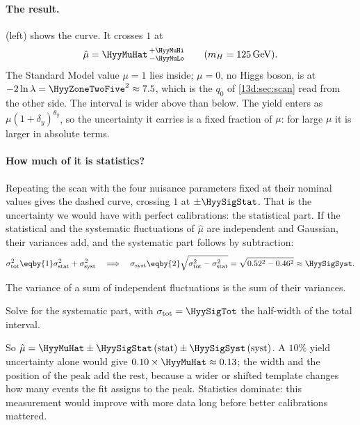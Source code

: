 \paragraph{The result.}
 (left) shows the curve. It crosses $1$ at
\[
  \hat\mu=\HyyMuHat\,^{+\HyyMuHi}_{-\HyyMuLo}\qquad(m_H=125\,\text{GeV}).
\]
The Standard Model value $\mu=1$ lies inside; $\mu=0$, no Higgs boson, is at
$-2\ln\lambda=\HyyZoneTwoFive^2\approx7.5$, which is the $q_0$ of \cref{13d:sec:scan}
read from the other side. The interval is wider above than below. The yield enters as
$\mu(1+\delta_y)^{\theta_y}$, so the uncertainty it carries is a fixed fraction of $\mu$:
for large $\mu$ it is larger in absolute terms.

\paragraph{How much of it is statistics?}
Repeating the scan with the four nuisance parameters fixed at their nominal values gives
the dashed curve, crossing $1$ at $\pm\HyySigStat$. That is the uncertainty we would have
with perfect calibrations: the statistical part. If the statistical and the systematic
fluctuations of $\hat\mu$ are independent and Gaussian, their variances add, and the
systematic part follows by subtraction:
\begin{equation}
  \sigma_{\rm tot}^2\eqby{1}\sigma_{\rm stat}^2+\sigma_{\rm syst}^2
  \quad\Longrightarrow\quad
  \sigma_{\rm syst}\eqby{2}\sqrt{\sigma_{\rm tot}^2-\sigma_{\rm stat}^2}
  =\sqrt{0.52^2-0.46^2}\approx\HyySigSyst .
  \label{13d:eq:syst}
\end{equation}
\begin{explain}
  \item The variance of a sum of independent fluctuations is the sum of their variances.
  \item Solve for the systematic part, with $\sigma_{\rm tot}=\HyySigTot$ the half-width of
        the total interval.
\end{explain}
So $\hat\mu=\HyyMuHat\pm\HyySigStat\,(\text{stat})\pm\HyySigSyst\,(\text{syst})$. A $10\%$ yield
uncertainty alone would give $0.10\times\HyyMuHat\approx0.13$; the width and the position
of the peak add the rest, because a wider or shifted template changes how many events the
fit assigns to the peak. Statistics dominate: this measurement would improve with more
data long before better calibrations mattered.

